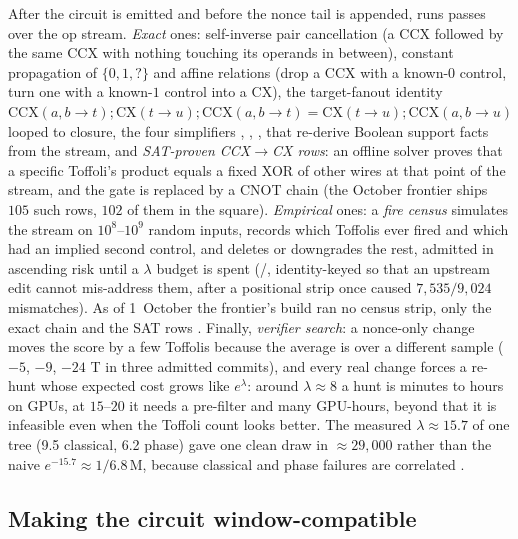 After the circuit is emitted and before the nonce tail is appended,  runs passes over the op stream. \emph{Exact} ones: self-inverse pair cancellation (a CCX followed by the same CCX with nothing touching its operands in between), constant propagation of $\{0,1,?\}$ and affine relations (drop a CCX with a known-$0$ control, turn one with a known-$1$ control into a CX), the target-fanout identity $\mathrm{CCX}(a,b\to t);\mathrm{CX}(t\to u);\mathrm{CCX}(a,b\to t)=\mathrm{CX}(t\to u);\mathrm{CCX}(a,b\to u)$ looped to closure, the four simplifiers , , ,  that re-derive Boolean support facts from the stream, and \emph{SAT-proven CCX$\to$CX rows}: an offline solver proves that a specific Toffoli's product equals a fixed XOR of other wires at that point of the stream, and the gate is replaced by a CNOT chain (the October frontier ships $105$ such rows, $102$ of them in the square). \emph{Empirical} ones: a \emph{fire census} simulates the stream on $10^8$--$10^9$ random inputs, records which Toffolis ever fired and which had an implied second control, and deletes or downgrades the rest, admitted in ascending risk until a $\lambda$ budget is spent (/, identity-keyed so that an upstream edit cannot mis-address them, after a positional strip once caused $7{,}535/9{,}024$ mismatches). As of 1~October the frontier's build ran no census strip, only the exact chain and the SAT rows \cite{ecdsafail-wiki}. Finally, \emph{verifier search}: a nonce-only change moves the score by a few Toffolis because the average is over a different sample ($-5$, $-9$, $-24$ T in three admitted commits), and every real change forces a re-hunt whose expected cost grows like $e^{\lambda}$: around $\lambda\approx8$ a hunt is minutes to hours on GPUs, at $15$--$20$ it needs a pre-filter and many GPU-hours, beyond that it is infeasible even when the Toffoli count looks better. The measured $\lambda\approx15.7$ of one tree (9.5 classical, 6.2 phase) gave one clean draw in $\approx29{,}000$ rather than the naive $e^{-15.7}\approx1/6.8$\,M, because classical and phase failures are correlated \cite{ecdsafail-wiki}.

\subsection{Making the circuit window-compatible}\label{sec:windowed}

